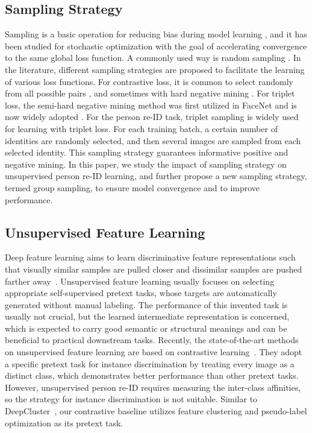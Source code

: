 \documentclass[lettersize,journal]{IEEEtran}
\begin{document}
\subsection{Sampling Strategy} 
Sampling is a basic operation for reducing bias during model learning \cite{sampling1}, and it has been studied for stochastic optimization \cite{stochastic} with the goal of accelerating convergence to the same global loss function. A commonly used way is random sampling \cite{ResNet,random-sampling1}. In the literature, different sampling strategies are proposed to facilitate the learning of various loss functions. For contrastive loss, it is common to select randomly from all possible pairs \cite{contrastive1, contrastive2, random-sampling1}, and sometimes with hard negative mining \cite{contrastive3}. For triplet loss, the semi-hard negative mining method was first utilized in FaceNet \cite{Facenet} and is now widely adopted \cite{semi-hard1, semi-hard2}. For the person re-ID task, triplet sampling \cite{triplet,strongbaseline} is widely used for learning with triplet loss. For each training batch, a certain number of identities are randomly selected, and then several images are sampled from each selected identity. 
This sampling strategy guarantees informative positive and negative mining. In this paper, we study the impact of sampling strategy on unsupervised person re-ID learning, and further propose a new sampling strategy, termed group sampling, to ensure model convergence and to improve performance.

\subsection{Unsupervised Feature Learning}
Deep feature learning aims to learn discriminative feature representations such that visually similar samples are pulled closer and dissimilar samples are pushed farther away~\cite{embeddinglearning}.
Unsupervised feature learning usually focuses on selecting appropriate self-supervised pretext tasks, whose targets are automatically generated without manual labeling. The performance of this invented task is usually not crucial, but the learned intermediate representation is concerned, which is expected to carry good semantic or structural meanings and can be beneficial to practical downstream tasks.
Recently, the state-of-the-art methods on unsupervised feature learning are based on contrastive learning~\cite{memorybank,CPC,CMC,Moco,SimCLR}. They adopt a specific pretext task for instance discrimination by treating every image as a distinct class, which demonstrates better performance than other pretext tasks. 
However, unsupervised person re-ID requires measuring the inter-class affinities, so the strategy for instance discrimination is not suitable.
Similar to DeepCluster~\cite{DeepCluster}, our contrastive baseline utilizes feature clustering and pseudo-label optimization as its pretext task.
\end{document}
